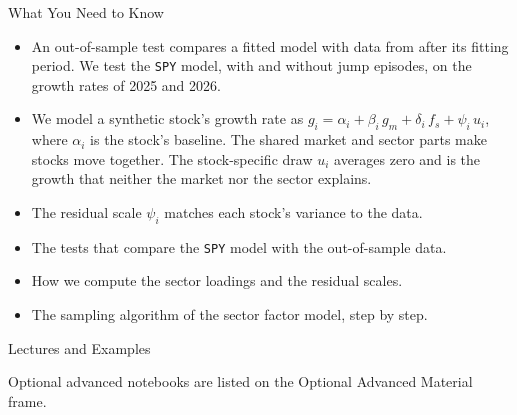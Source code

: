 \documentclass[aspectratio=169,11pt]{beamer}
\newcommand{\repo}{https://github.com/varnerlab/CHEME-5660-CourseRepository-Fall-2026/blob/main/lectures/week-13/L13b}
\begin{document}
\begin{frame}{What You Need to Know}
  \vspace{0.3em}
  {\large\textbf{}}
  \begin{itemize}\setlength{\itemsep}{0.15em}
    \item An out-of-sample test compares a fitted model with data from after its fitting
      period. We test the \texttt{SPY} model, with and without jump episodes, on the growth
      rates of 2025 and 2026.
    \item We model a synthetic stock's growth rate as
      $g_{i}=\alpha_{i}+\beta_{i}\,g_{m}+\delta_{i}\,f_{s}+\psi_{i}\,u_{i}$, where $\alpha_i$ is the
      stock's baseline. The shared market and sector parts make stocks move together. The
      stock-specific draw $u_i$ averages zero and is the growth that neither the market nor the
      sector explains.
    \item The residual scale $\psi_i$ matches each stock's variance to the data.
  \end{itemize}

  \vspace{0.3em}
  {\large\textbf{} }
  \begin{itemize}\setlength{\itemsep}{0.2em}
    \item The tests that compare the \texttt{SPY} model with the out-of-sample data.
    \item How we compute the sector loadings and the residual scales.
    \item The sampling algorithm of the sector factor model, step by step.
  \end{itemize}
\end{frame}

\begin{frame}{Lectures and Examples}
  \vspace{0.3em}
  {\normalsize\textbf{}\par\small
  \href{\repo/CHEME-5660-L13b-Lecture-JumpHMM-ManyStocks-Fall-2026.ipynb}{}}

  \vspace{0.6em}
  {\normalsize\textbf{}\par\small
  \href{\repo/CHEME-5660-L13b-Example-JumpHMM-SPY-OutOfSample-Fall-2026.ipynb}{}\par
  \href{\repo/CHEME-5660-L13b-Example-JumpHMM-SectorFactor-Fall-2026.ipynb}{}}

  \vspace{0.6em}
  Optional advanced notebooks are listed on the Optional Advanced Material frame.
\end{frame}
\end{document}
